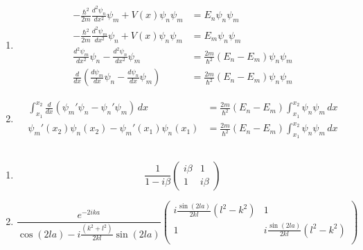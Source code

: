 \documentclass{article}
\begin{document}
\subsection{}

\begin{enumerate}
  \item

        \begin{align*}
          -\frac{\hbar^2}{2 m} \frac{d^2 \psi_n}{d x^2} \psi_m + V(x) \psi_n \psi_m              & = E_n \psi_n \psi_m                             \\
          -\frac{\hbar^2}{2 m} \frac{d^2 \psi_m}{d x^2} \psi_n + V(x) \psi_n \psi_m              & = E_m \psi_n \psi_m                             \\
          \frac{d^2 \psi_m}{d x^2} \psi_n - \frac{d^2 \psi_n}{d x^2} \psi_m                      & = \frac{2 m}{\hbar^2} (E_n - E_m) \psi_n \psi_m \\
          \frac{d}{d x} \left( \frac{d \psi_m}{d x} \psi_n - \frac{d \psi_n}{d x} \psi_m \right) & = \frac{2 m}{\hbar^2} (E_n - E_m) \psi_n \psi_m
        \end{align*}

  \item

        \begin{align*}
          \int_{x_1}^{x_2} \frac{d}{d x} (\psi_m' \psi_n - \psi_n' \psi_m) \,d x & = \frac{2 m}{\hbar^2} (E_n - E_m) \int_{x_1}^{x_2} \psi_n \psi_m \,d x \\
          \psi_m'(x_2) \psi_n(x_2) - \psi_m'(x_1) \psi_n(x_1)                    & = \frac{2 m}{\hbar^2} (E_n - E_m) \int_{x_1}^{x_2} \psi_n \psi_m \,d x
        \end{align*}
\end{enumerate}

\setcounter{subsection}{52}
\subsection{}

\begin{enumerate}
  \item

        \[\frac{1}{1 - i \beta} \begin{pmatrix}
            i \beta & 1       \\
            1       & i \beta
          \end{pmatrix}\]

  \item

        \[\frac{e^{-2 i k a}}{\cos (2 l a) - i \frac{(k^2 + l^2)}{2 k l} \sin (2 l a)} \begin{pmatrix}
            i \frac{\sin (2 l a)}{2 k l} (l^2 - k^2) & 1                                        \\
            1                                        & i \frac{\sin (2 l a)}{2 k l} (l^2 - k^2) \\
          \end{pmatrix}\]
\end{enumerate}
\end{document}
